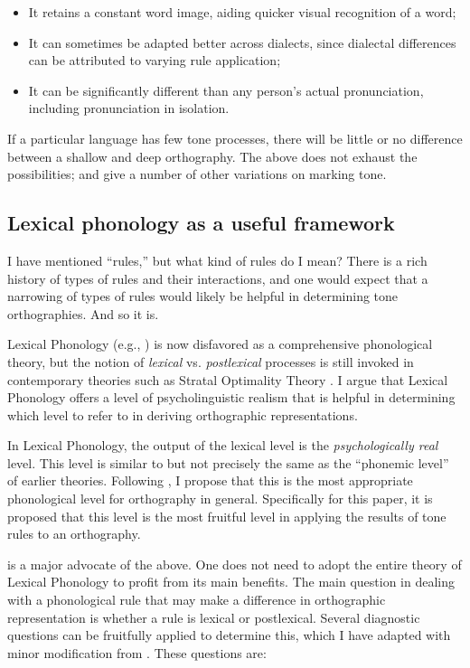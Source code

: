 \documentclass[output=paper]{langscibook}
\begin{document}
\begin{itemize}
    \item It retains a constant word image, aiding quicker visual recognition of a word;
    \item It can sometimes be adapted better across dialects, since dialectal differences can be attributed to varying rule application;
    \item It can be significantly different than any person’s actual pronunciation, including pronunciation in isolation.
\end{itemize}

If a particular language has few tone processes, there will be little or no difference between a shallow and deep orthography. The above does not exhaust the possibilities; \citet{Bird1999b} and \citet{Roberts2013} give a number of other variations on marking tone.

\subsection{Lexical phonology as a useful framework}
\label{sec:PhonTheoryOrtho:LexicalPhonology:1}

I have mentioned “rules,” but what kind of rules do I mean? There is a rich history of types of rules and their interactions, and one would expect that a narrowing of types of rules would likely be helpful in determining tone orthographies. And so it is.

Lexical Phonology (e.g., \citealt{Pulleyblank1986}) is now disfavored as a comprehensive phonological theory, but the notion of \textit{lexical} vs. \textit{postlexical} processes is still invoked in contemporary theories such as Stratal Optimality Theory \citep{Kiparsky2000,Goldsmith2014}. I argue that Lexical Phonology offers a level of psycholinguistic realism that is helpful in determining which level to refer to in deriving orthographic representations. 

In Lexical Phonology, the output of the lexical level is the \textit{psychologically real} level. This level  is similar to but not precisely the same as the “phonemic level” of earlier theories. Following \citet{Snider2014}, I propose that this is the most appropriate phonological level for orthography in general. Specifically for this paper, it is proposed that this level is the most fruitful level in applying the results of tone rules to an orthography. 

\citet{Snider2014} is a major advocate of the above. One does not need to adopt the entire theory of Lexical Phonology to profit from its main benefits. The main question in dealing with a phonological rule that may make a difference in orthographic representation is whether a rule is lexical or postlexical. Several diagnostic questions can be fruitfully applied to determine this, which I have adapted with minor modification from \citet{Snider2014}. These questions are: 
\end{document}
